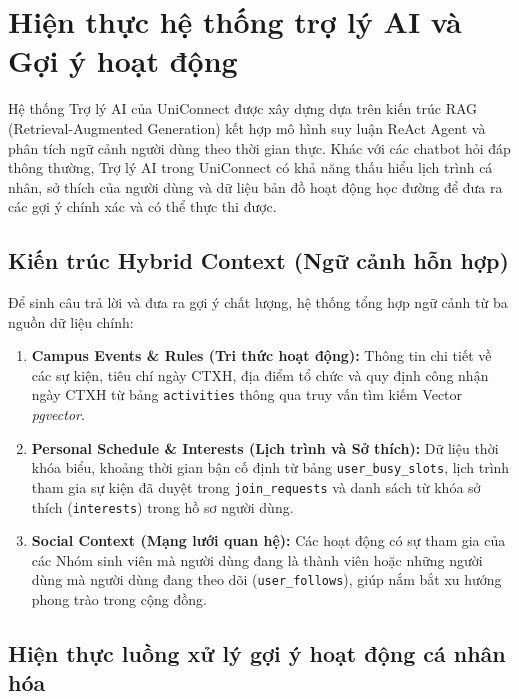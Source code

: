 \section{Hiện thực hệ thống trợ lý AI và Gợi ý hoạt động}

Hệ thống Trợ lý AI của UniConnect được xây dựng dựa trên kiến trúc RAG (Retrieval-Augmented Generation) kết hợp mô hình suy luận ReAct Agent và phân tích ngữ cảnh người dùng theo thời gian thực. Khác với các chatbot hỏi đáp thông thường, Trợ lý AI trong UniConnect có khả năng thấu hiểu lịch trình cá nhân, sở thích của người dùng và dữ liệu bản đồ hoạt động học đường để đưa ra các gợi ý chính xác và có thể thực thi được.

\subsection{Kiến trúc Hybrid Context (Ngữ cảnh hỗn hợp)}

Để sinh câu trả lời và đưa ra gợi ý chất lượng, hệ thống tổng hợp ngữ cảnh từ ba nguồn dữ liệu chính:
\begin{enumerate}
    \item \textbf{Campus Events \& Rules (Tri thức hoạt động):} Thông tin chi tiết về các sự kiện, tiêu chí ngày CTXH, địa điểm tổ chức và quy định công nhận ngày CTXH từ bảng \texttt{activities} thông qua truy vấn tìm kiếm Vector \textit{pgvector}.

    \item \textbf{Personal Schedule \& Interests (Lịch trình và Sở thích):} Dữ liệu thời khóa biểu, khoảng thời gian bận cố định từ bảng \texttt{user\_busy\_slots}, lịch trình tham gia sự kiện đã duyệt trong \texttt{join\_requests} và danh sách từ khóa sở thích (\texttt{interests}) trong hồ sơ người dùng.
    
    \item \textbf{Social Context (Mạng lưới quan hệ):} Các hoạt động có sự tham gia của các Nhóm sinh viên mà người dùng đang là thành viên hoặc những người dùng mà người dùng đang theo dõi (\texttt{user\_follows}), giúp nắm bắt xu hướng phong trào trong cộng đồng.
\end{enumerate}

\subsection{Hiện thực luồng xử lý gợi ý hoạt động cá nhân hóa}

